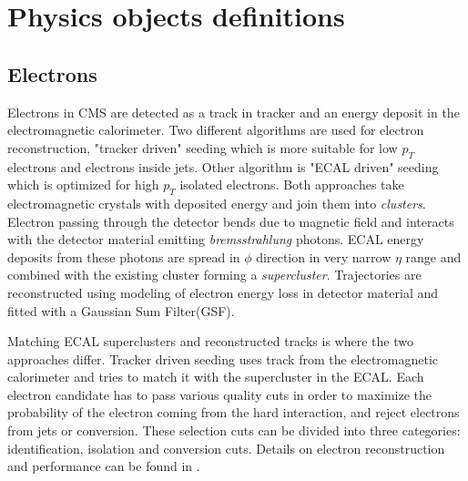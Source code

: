 \chapter{Physics objects definitions} %

\label{Chapter5} %





\section{Electrons}

Electrons in CMS are detected as a track in tracker and an energy deposit in the electromagnetic calorimeter. Two different algorithms are used for electron reconstruction, "tracker driven" seeding which is more suitable for low $p_T$ electrons and electrons inside jets. Other algorithm is "ECAL driven" seeding which is optimized for high $p_T$ isolated electrons. Both approaches take electromagnetic crystals with deposited energy and join them into \textit{clusters}. Electron passing through the detector bends due to magnetic field and interacts with the detector material emitting \textit{bremsstrahlung} photons. ECAL energy deposits from these photons are spread in $\phi$ direction in very narrow $\eta$ range and combined with the existing cluster forming a \textit{supercluster}. Trajectories are reconstructed using modeling of electron energy loss in detector material and fitted with a Gaussian Sum Filter(GSF)\cite{2005JPhG31N9A}.
\par Matching ECAL superclusters and reconstructed tracks is where the two approaches differ. Tracker driven seeding uses track from the electromagnetic calorimeter and tries to match it with the supercluster in the ECAL.   
Each electron candidate has to pass various quality cuts in order to maximize the probability of the electron coming from the hard interaction, and reject electrons from jets or conversion. These selection cuts can be divided into three categories: identification, isolation and conversion cuts. Details on electron reconstruction and performance can be found in \cite{CMS:2010bta}.

